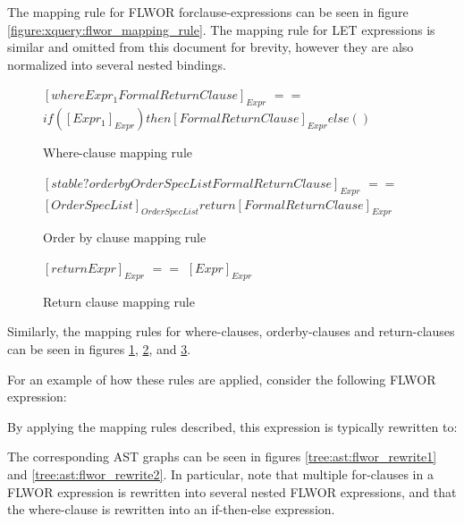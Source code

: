The mapping rule for FLWOR forclause-expressions can be seen in figure
\ref{figure:xquery:flwor_mapping_rule}. The mapping rule for LET expressions is
similar and omitted from this document for brevity, however they are also
normalized into several nested bindings.

\begin{figure}[!h]
\centering
$[where Expr_1 FormalReturnClause]_{Expr}$ \newline
$==$ \newline
$if ([Expr_1]_{Expr}) then [FormalReturnClause]_{Expr} else ()$
  \caption{Where-clause mapping rule}
  \label{figure:xquery:where_mapping_rule}
\end{figure}

\begin{figure}[!h]
\centering
$[stable? order by OrderSpecList FormalReturnClause]_{Expr}$ \newline
$==$ \newline
$[OrderSpecList]_{OrderSpecList} return [FormalReturnClause]_{Expr}$
  \caption{Order by clause mapping rule}
  \label{figure:xquery:orderby_mapping_rule}
\end{figure}

\begin{figure}[!h]
\centering
$[return Expr]_{Expr}$ \newline
$==$ \newline
$[Expr]_{Expr}$
  \caption{Return clause mapping rule}
  \label{figure:xquery:return_mapping_rule}
\end{figure}

Similarly, the mapping rules for where-clauses, orderby-clauses and
return-clauses can be seen in figures \ref{figure:xquery:where_mapping_rule},
\ref{figure:xquery:orderby_mapping_rule},
and \ref{figure:xquery:return_mapping_rule}.

For an example of how these rules are applied, consider the following FLWOR
expression:


By applying the mapping rules described,  this expression is typically
rewritten to:


The corresponding AST graphs can be seen in figures
\ref{tree:ast:flwor_rewrite1} and \ref{tree:ast:flwor_rewrite2}. In particular,
note that multiple for-clauses in a FLWOR expression is rewritten into several
nested FLWOR expressions, and that the where-clause is  rewritten into an
if-then-else expression. 


